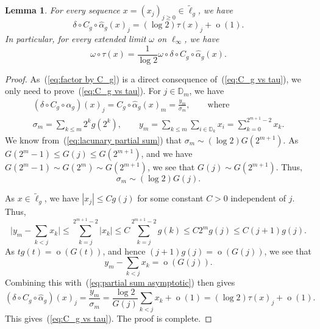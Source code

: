 \documentclass[10pt, a4paper]{amsart}
\newcommand{\D}{\mathbb{D}}
\newcommand{\op}{\operatorname}
\numberwithin{equation}{section}
\newtheorem{lemma}[theorem]{Lemma}
\theoremstyle{definition}
\theoremstyle{remark}
\begin{document}
\begin{lemma}\label{lem:new}
 For every sequence $x=(x_j)_{j\geq 0}\in \tilde{\ell}_g$, we have
 \begin{equation}\label{eq:C_g vs tau}
 \delta\circ C_g \circ \hat{\alpha}_g(x)_j = (\log 2)  \tau(x)_j + \op{o}(1).
\end{equation}
In particular, for every extended limit $\omega$ on $\ell_\infty$, we have
\begin{equation}\label{eq:factor by C_g}
 \omega\circ\tau (x)= \frac{1}{\log 2} \omega\circ \delta\circ C_g \circ \hat{\alpha}_g(x).
\end{equation}
\end{lemma}
\begin{proof}
As~(\ref{eq:factor by C_g}) is a direct consequence of~(\ref{eq:C_g vs tau}), we only need to prove~(\ref{eq:C_g vs tau}). For $j\in \D_m$, we have
\begin{gather*}
 (\delta\circ C_g \circ \hat{\alpha}_g)(x)_j = C_g\circ \hat{\alpha}_g(x)_m = \frac{y_m}{\sigma_m}, \qquad \text{where}\\
 \sigma_m = \sum_{k\leq m} 2^k g(2^k), \qquad y_m= \sum_{k\leq m}\sum_{i\in \D_k} x_i= \sum_{k=0}^{2^{m+1}-2} x_k.
\end{gather*}
We know from~(\ref{eq:lacunary partial sum}) that $\sigma_m\sim (\log 2) G(2^{m+1})$. As $G(2^m-1)\leq G(j) \leq G(2^{m+1})$, and we have $G(2^m-1)\sim G(2^m)\sim G(2^{m+1})$, we see that $G(j)\sim G(2^{m+1})$. Thus,
\begin{equation}\label{eq:partial sum asymptotic}
 \sigma_m \sim (\log 2) G(j).
\end{equation}

As $x \in \tilde{\ell}_g$, we have $|x_j|\leq Cg(j)$ for some constant $C>0$ independent of $j$. Thus,
\begin{equation*}
 \bigg| y_m -\sum_{k< j} x_k\bigg| \leq \sum_{k=j}^{2^{m+1}-2} |x_k| \leq C  \sum_{k=j}^{2^{m+1}-2} g(k)\leq C 2^m g(j)\leq C(j+1)g(j).
\end{equation*}
As $tg(t)=\op{o}(G(t))$, and hence $(j+1)g(j)=\op{o}(G(j))$, we see that
\begin{equation*}
 y_m -\sum_{k< j} x_k =\op{o}(G(j)).
\end{equation*}
Combining this with~(\ref{eq:partial sum asymptotic}) then gives
\begin{equation*}
  (\delta\circ C_g \circ \hat{\alpha}_g)(x)_j =  \frac{y_m}{\sigma_m}=  \frac{\log 2}{G(j)}\sum_{k< j} x_k+\op{o}(1)=(\log 2)  \tau(x)_j + \op{o}(1).
\end{equation*}
This gives~(\ref{eq:C_g vs tau}). The proof is complete.
\end{proof}
\end{document}
